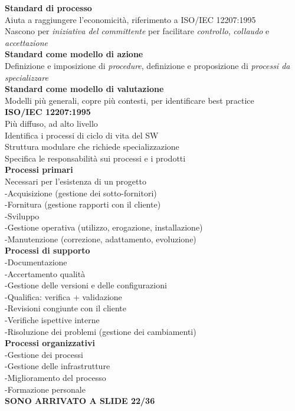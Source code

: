 \documentclass{article}
\begin{document}
			
			\textbf{Standard di processo}\\
			Aiuta a raggiungere l'economicità, riferimento a ISO/IEC 12207:1995\\
			Nascono per \textit{iniziativa del committente} per facilitare \textit{controllo}, \textit{collaudo} e \textit{accettazione}\\
			
			\textbf{Standard come modello di azione}\\
			Definizione e imposizione di \textit{procedure}, definizione e proposizione di \textit{processi da specializzare}\\
			
			\textbf{Standard come modello di valutazione}\\
			Modelli più generali, copre più contesti, per identificare best practice\\
		
			\textbf{ISO/IEC 12207:1995}\\
			Più diffuso, ad alto livello\\
			Identifica i processi di ciclo di vita del SW\\
			Struttura modulare che richiede specializzazione\\
			Specifica le responsabilità sui processi e i prodotti\\
			
			\textbf{Processi primari}\\
			Necessari per l'esistenza di un progetto\\
			-Acquisizione (gestione dei sotto-fornitori)\\
			-Fornitura (gestione rapporti con il cliente)\\
			-Sviluppo\\
			-Gestione operativa (utilizzo, erogazione, installazione)\\
			-Manutenzione (correzione, adattamento, evoluzione)\\
			
			\textbf{Processi di supporto}\\
			-Documentazione\\
			-Accertamento qualità\\
			-Gestione delle versioni e delle configurazioni\\
			-Qualifica: verifica + validazione\\
			-Revisioni congiunte con il cliente\\
			-Verifiche ispettive interne\\
			-Risoluzione dei problemi (gestione dei cambiamenti)\\
			
			\textbf{Processi organizzativi}\\
			-Gestione dei processi\\
			-Gestione delle infrastrutture\\
			-Miglioramento del processo\\
			-Formazione personale\\
			
			
			\textbf{SONO ARRIVATO A SLIDE 22/36}\\
			
			
			
			
			
			
			
			
			
	
\end{document}

